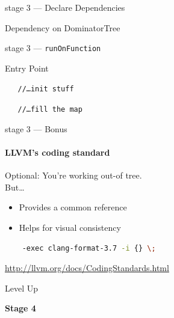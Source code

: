 \documentclass[14pt]{beamer}
\begin{document}
    \begin{frame}[containsverbatim]{stage 3 --- Declare Dependencies}

        \begin{alertblock}{Dependency on DominatorTree}
        {
        \footnotesize
        
        }
        \end{alertblock}

    \end{frame}

    \begin{frame}[containsverbatim]{stage 3 --- \texttt{runOnFunction}}
        \begin{alertblock}{Entry Point}
        {
        \footnotesize
        
        \texttt{~~~//\dots init stuff}
        
        \texttt{~~~//\dots fill the map}
        
        }
        \end{alertblock}
    \end{frame}

    \begin{frame}[containsverbatim]{stage 3 --- Bonus}
        \framesubtitle{LLVM's coding standard}

        \alert{Optional}: You're working out-of tree.\\
        But\dots
        \begin{itemize}
            \item Provides a common reference
            \item Helps for visual consistency
        \end{itemize}
        {
            \footnotesize
\begin{lstlisting}[language=bash]
% find . \( -name '*.cpp' -o -name '*.h' \) \
    -exec clang-format-3.7 -i {} \;
\end{lstlisting}
        }
        \url{http://llvm.org/docs/CodingStandards.html}

    \end{frame}


    \begin{frame}{Level Up}
        \begin{center}
            \textbf{\Large Stage 4}
        \end{center}
    \end{frame}
\end{document}
